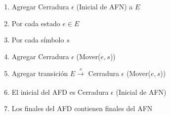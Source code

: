 \begin{enumerate}
	\item Agregar Cerradura $\epsilon$ (Inicial de AFN) a $E$
	\item Por cada estado $e \in E$
	\item 		Por cada símbolo $s$
	\item			Agregar Cerradura $\epsilon$ (Mover($e,s$))
	\item 			Agregar transición $E \xrightarrow[]{s} $ Cerradura $\epsilon$ (Mover($e,s$))
	\item El inicial del AFD es Cerradura $\epsilon$ (Inicial de AFN)
	\item Los finales del AFD contienen finales del AFN
\end{enumerate}









